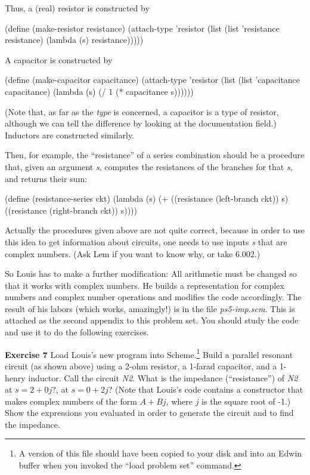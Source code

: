 Thus, a (real) resistor is constructed by

\beginlisp
(define (make-resistor resistance)
  (attach-type 'resistor
               (list (list 'resistance resistance)
                     (lambda (s) resistance)))))
\endlisp

A capacitor is constructed by

\beginlisp
(define (make-capacitor capacitance)
  (attach-type 'resistor
               (list (list 'capacitance capacitance)
                     (lambda (s)
                       (/ 1 (* capacitance s))))))
\endlisp

(Note that, as far as the {\it type} is concerned, a capacitor is a type
of resistor, although we can tell the difference by looking at the
documentation field.)  Inductors are constructed similarly.

Then, for example, the ``resistance'' of a series combination should
be a procedure that, given an argument {\it s}, computes the
resistances of the branches for that {\it s}, and returns their sum:

\beginlisp
(define (resistance-series ckt)
  (lambda (s)
    (+ ((resistance (left-branch ckt)) s)
       ((resistance (right-branch ckt)) s))))
\endlisp

Actually the procedures given above are not quite correct, because in
order to use this idea to get information about circuits, one needs to
use inputs {\it s} that are complex numbers.  (Ask Lem if you want to
know why, or take 6.002.)

So Louis has to make a further modification: All arithmetic must be
changed so that it works with complex numbers.  He builds a
representation for complex numbers and complex number operations and
modifies the code accordingly.  The result of his labors (which works,
amazingly!) is in the file {\it ps5-imp.scm}.  This is attached as the
second appendix to this problem set.  You should study the code and
use it to do the following exercises.

{\bf Exercise 7} Load Louis's new program into Scheme.\footnote{A version of
this file should have been copied to your disk and into an Edwin buffer when
you invoked the ``load problem set'' command.} Build a parallel resonant
circuit (as shown above) using a 2-ohm resistor, a 1-farad capacitor, and a
1-henry inductor.  Call the circuit {\it N2}.  What
is the impedance (``resistance'') of {\it N2} at $s=2+0j$?, at $s=0+2j$?  (Note
that Louis's code contains a constructor that makes complex numbers of the form
$A+Bj$, where $j$ is the square root of -1.)  Show the expressions you
evaluated in order to generate the circuit and to find the impedance.

